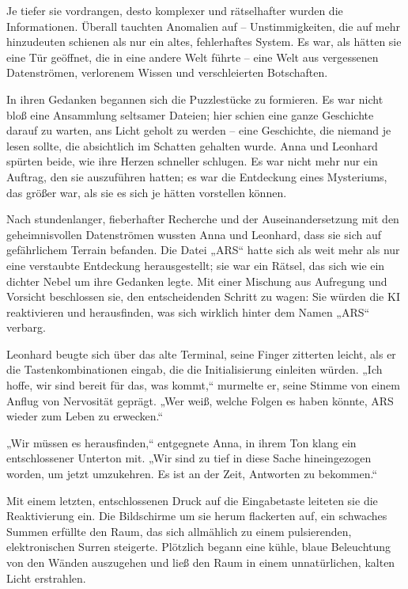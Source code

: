 \documentclass[
]{article}
\begin{document}
Je tiefer sie vordrangen, desto komplexer und rätselhafter wurden die
Informationen. Überall tauchten Anomalien auf -- Unstimmigkeiten, die
auf mehr hinzudeuten schienen als nur ein altes, fehlerhaftes System. Es
war, als hätten sie eine Tür geöffnet, die in eine andere Welt führte --
eine Welt aus vergessenen Datenströmen, verlorenem Wissen und
verschleierten Botschaften.

In ihren Gedanken begannen sich die Puzzlestücke zu formieren. Es war
nicht bloß eine Ansammlung seltsamer Dateien; hier schien eine ganze
Geschichte darauf zu warten, ans Licht geholt zu werden -- eine
Geschichte, die niemand je lesen sollte, die absichtlich im Schatten
gehalten wurde. Anna und Leonhard spürten beide, wie ihre Herzen
schneller schlugen. Es war nicht mehr nur ein Auftrag, den sie
auszuführen hatten; es war die Entdeckung eines Mysteriums, das größer
war, als sie es sich je hätten vorstellen können.

Nach stundenlanger, fieberhafter Recherche und der Auseinandersetzung
mit den geheimnisvollen Datenströmen wussten Anna und Leonhard, dass sie
sich auf gefährlichem Terrain befanden. Die Datei „ARS`` hatte sich als
weit mehr als nur eine verstaubte Entdeckung herausgestellt; sie war ein
Rätsel, das sich wie ein dichter Nebel um ihre Gedanken legte. Mit einer
Mischung aus Aufregung und Vorsicht beschlossen sie, den entscheidenden
Schritt zu wagen: Sie würden die KI reaktivieren und herausfinden, was
sich wirklich hinter dem Namen „ARS`` verbarg.

Leonhard beugte sich über das alte Terminal, seine Finger zitterten
leicht, als er die Tastenkombinationen eingab, die die Initialisierung
einleiten würden. „Ich hoffe, wir sind bereit für das, was kommt,``
murmelte er, seine Stimme von einem Anflug von Nervosität geprägt. „Wer
weiß, welche Folgen es haben könnte, ARS wieder zum Leben zu erwecken.``

„Wir müssen es herausfinden,`` entgegnete Anna, in ihrem Ton klang ein
entschlossener Unterton mit. „Wir sind zu tief in diese Sache
hineingezogen worden, um jetzt umzukehren. Es ist an der Zeit, Antworten
zu bekommen.``

Mit einem letzten, entschlossenen Druck auf die Eingabetaste leiteten
sie die Reaktivierung ein. Die Bildschirme um sie herum flackerten auf,
ein schwaches Summen erfüllte den Raum, das sich allmählich zu einem
pulsierenden, elektronischen Surren steigerte. Plötzlich begann eine
kühle, blaue Beleuchtung von den Wänden auszugehen und ließ den Raum in
einem unnatürlichen, kalten Licht erstrahlen.
\end{document}
